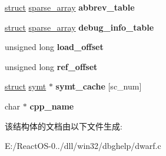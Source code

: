 \begin{DoxyCompactItemize}
\hyperlink{interfacestruct}{struct} \hyperlink{structsparse__array}{sparse\+\_\+array} {\bfseries abbrev\+\_\+table}
\item 
\mbox{\label{structdwarf2__parse__context__s_add329bc472324619e79b5067e0020deb}} 
\hyperlink{interfacestruct}{struct} \hyperlink{structsparse__array}{sparse\+\_\+array} {\bfseries debug\+\_\+info\+\_\+table}
\item 
\mbox{\label{structdwarf2__parse__context__s_a2a80ff9df6edd90c02e05a516f48bee8}} 
unsigned long {\bfseries load\+\_\+offset}
\item 
\mbox{\label{structdwarf2__parse__context__s_a57053ff6550f06e2e5e677e64a8355e6}} 
unsigned long {\bfseries ref\+\_\+offset}
\item 
\mbox{\label{structdwarf2__parse__context__s_af258d22120031adfc17355b22e87b4e6}} 
\hyperlink{interfacestruct}{struct} \hyperlink{structsymt}{symt} $\ast$ {\bfseries symt\+\_\+cache} \mbox{[}sc\+\_\+num\mbox{]}
\item 
\mbox{\label{structdwarf2__parse__context__s_a9bdc4d4b76a94f15f5ed4b0c5fe08dd0}} 
char $\ast$ {\bfseries cpp\+\_\+name}
\end{DoxyCompactItemize}


该结构体的文档由以下文件生成\+:\begin{DoxyCompactItemize}
\item 
E\+:/\+React\+O\+S-\/0../dll/win32/dbghelp/dwarf.\+c\end{DoxyCompactItemize}
